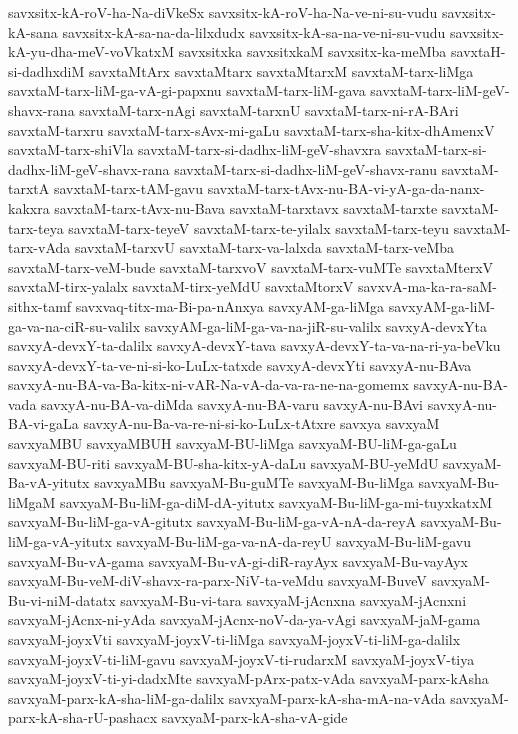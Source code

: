 {savxsitx-kA-roV-ha-Na-diVkeSx
savxsitx-kA-roV-ha-Na-ve-ni-su-vudu
savxsitx-kA-sana
savxsitx-kA-sa-na-da-lilxdudx
savxsitx-kA-sa-na-ve-ni-su-vudu
savxsitx-kA-yu-dha-meV-voVkatxM
savxsitxka
savxsitxkaM
savxsitx-ka-meMba
savxtaH-si-dadhxdiM
savxtaMtArx
savxtaMtarx
savxtaMtarxM
savxtaM-tarx-liMga
savxtaM-tarx-liM-ga-vA-gi-papxnu
savxtaM-tarx-liM-gava
savxtaM-tarx-liM-geV-shavx-rana
savxtaM-tarx-nAgi
savxtaM-tarxnU
savxtaM-tarx-ni-rA-BAri
savxtaM-tarxru
savxtaM-tarx-sAvx-mi-gaLu
savxtaM-tarx-sha-kitx-dhAmenxV
savxtaM-tarx-shiVla
savxtaM-tarx-si-dadhx-liM-geV-shavxra
savxtaM-tarx-si-dadhx-liM-geV-shavx-rana
savxtaM-tarx-si-dadhx-liM-geV-shavx-ranu
savxtaM-tarxtA
savxtaM-tarx-tAM-gavu
savxtaM-tarx-tAvx-nu-BA-vi-yA-ga-da-nanx-kakxra
savxtaM-tarx-tAvx-nu-Bava
savxtaM-tarxtavx
savxtaM-tarxte
savxtaM-tarx-teya
savxtaM-tarx-teyeV
savxtaM-tarx-te-yilalx
savxtaM-tarx-teyu
savxtaM-tarx-vAda
savxtaM-tarxvU
savxtaM-tarx-va-lalxda
savxtaM-tarx-veMba
savxtaM-tarx-veM-bude
savxtaM-tarxvoV
savxtaM-tarx-vuMTe
savxtaMterxV
savxtaM-tirx-yalalx
savxtaM-tirx-yeMdU
savxtaMtorxV
savxvA-ma-ka-ra-saM-sithx-tamf
savxvaq-titx-ma-Bi-pa-nAnxya
savxyAM-ga-liMga
savxyAM-ga-liM-ga-va-na-ciR-su-valilx
savxyAM-ga-liM-ga-va-na-jiR-su-valilx
savxyA-devxYta
savxyA-devxY-ta-dalilx
savxyA-devxY-tava
savxyA-devxY-ta-va-na-ri-ya-beVku
savxyA-devxY-ta-ve-ni-si-ko-LuLx-tatxde
savxyA-devxYti
savxyA-nu-BAva
savxyA-nu-BA-va-Ba-kitx-ni-vAR-Na-vA-da-va-ra-ne-na-gomemx
savxyA-nu-BA-vada
savxyA-nu-BA-va-diMda
savxyA-nu-BA-varu
savxyA-nu-BAvi
savxyA-nu-BA-vi-gaLa
savxyA-nu-Ba-va-re-ni-si-ko-LuLx-tAtxre
savxya
savxyaM
savxyaMBU
savxyaMBUH
savxyaM-BU-liMga
savxyaM-BU-liM-ga-gaLu
savxyaM-BU-riti
savxyaM-BU-sha-kitx-yA-daLu
savxyaM-BU-yeMdU
savxyaM-Ba-vA-yitutx
savxyaMBu
savxyaM-Bu-guMTe
savxyaM-Bu-liMga
savxyaM-Bu-liMgaM
savxyaM-Bu-liM-ga-diM-dA-yitutx
savxyaM-Bu-liM-ga-mi-tuyxkatxM
savxyaM-Bu-liM-ga-vA-gitutx
savxyaM-Bu-liM-ga-vA-nA-da-reyA
savxyaM-Bu-liM-ga-vA-yitutx
savxyaM-Bu-liM-ga-va-nA-da-reyU
savxyaM-Bu-liM-gavu
savxyaM-Bu-vA-gama
savxyaM-Bu-vA-gi-diR-rayAyx
savxyaM-Bu-vayAyx
savxyaM-Bu-veM-diV-shavx-ra-parx-NiV-ta-veMdu
savxyaM-BuveV
savxyaM-Bu-vi-niM-datatx
savxyaM-Bu-vi-tara
savxyaM-jAcnxna
savxyaM-jAcnxni
savxyaM-jAcnx-ni-yAda
savxyaM-jAcnx-noV-da-ya-vAgi
savxyaM-jaM-gama
savxyaM-joyxVti
savxyaM-joyxV-ti-liMga
savxyaM-joyxV-ti-liM-ga-dalilx
savxyaM-joyxV-ti-liM-gavu
savxyaM-joyxV-ti-rudarxM
savxyaM-joyxV-tiya
savxyaM-joyxV-ti-yi-dadxMte
savxyaM-pArx-patx-vAda
savxyaM-parx-kAsha
savxyaM-parx-kA-sha-liM-ga-dalilx
savxyaM-parx-kA-sha-mA-na-vAda
savxyaM-parx-kA-sha-rU-pashacx
savxyaM-parx-kA-sha-vA-gide
}
